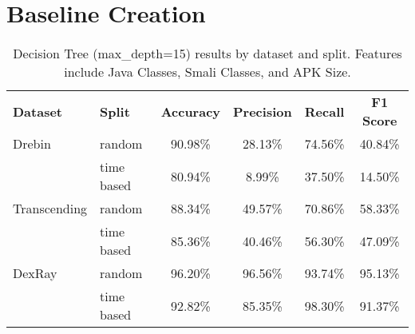 \newpage

\section{Baseline Creation}\label{AppendixBaselineCreation}

\vspace{0em} %

\begin{table}[h!]
    \caption{\label{tab:decisiontree}%
    Decision Tree (max\_depth=15) results by dataset and split. Features include Java Classes, Smali Classes, and APK Size.}
    \centering
    \small %
    \begin{tabular}{@{}llcccc@{}}
    \toprule
    \textbf{Dataset} & \textbf{Split} & \textbf{Accuracy} & \textbf{Precision} & \textbf{Recall} & \textbf{F1 Score} \\ \cmidrule(r){1-2} \cmidrule(lr){3-6}
    Drebin         & random     & 90.98\% & 28.13\% & 74.56\% & 40.84\% \\
                   & time based & 80.94\% & 8.99\%  & 37.50\% & 14.50\% \\ \addlinespace
    Transcending   & random     & 88.34\% & 49.57\% & 70.86\% & 58.33\% \\
                   & time based & 85.36\% & 40.46\% & 56.30\% & 47.09\% \\ \addlinespace
    DexRay         & random     & 96.20\% & 96.56\% & 93.74\% & 95.13\% \\
                   & time based & 92.82\% & 85.35\% & 98.30\% & 91.37\% \\
    \bottomrule
    \end{tabular}
\end{table}

\vspace{2em} %

